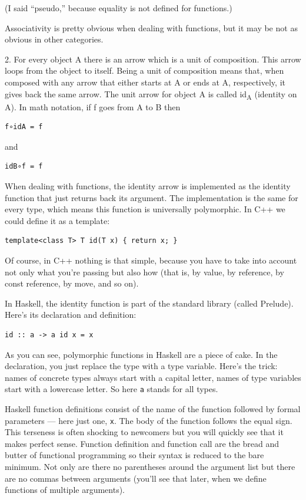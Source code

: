 (I said ``pseudo,'' because equality is not defined for functions.)

Associativity is pretty obvious when dealing with functions, but it may
be not as obvious in other categories.

2. For every object A there is an arrow which is a unit of composition.
This arrow loops from the object to itself. Being a unit of composition
means that, when composed with any arrow that either starts at A or ends
at A, respectively, it gives back the same arrow. The unit arrow for
object A is called id\textsubscript{A} (identity on A). In math
notation, if f goes from A to B then

\begin{verbatim}
f∘idA = f
\end{verbatim}

and

\begin{verbatim}
idB∘f = f
\end{verbatim}

When dealing with functions, the identity arrow is implemented as the
identity function that just returns back its argument. The
implementation is the same for every type, which means this function is
universally polymorphic. In C++ we could define it as a template:

\begin{verbatim}
template<class T> T id(T x) { return x; }
\end{verbatim}

Of course, in C++ nothing is that simple, because you have to take into
account not only what you're passing but also how (that is, by value, by
reference, by const reference, by move, and so on).

In Haskell, the identity function is part of the standard library
(called Prelude). Here's its declaration and definition:

\begin{verbatim}
id :: a -> a id x = x
\end{verbatim}

As you can see, polymorphic functions in Haskell are a piece of cake. In
the declaration, you just replace the type with a type variable. Here's
the trick: names of concrete types always start with a capital letter,
names of type variables start with a lowercase letter. So here
\texttt{a} stands for all types.

Haskell function definitions consist of the name of the function
followed by formal parameters --- here just one, \texttt{x}. The body of
the function follows the equal sign. This terseness is often shocking to
newcomers but you will quickly see that it makes perfect sense. Function
definition and function call are the bread and butter of functional
programming so their syntax is reduced to the bare minimum. Not only are
there no parentheses around the argument list but there are no commas
between arguments (you'll see that later, when we define functions of
multiple arguments).


